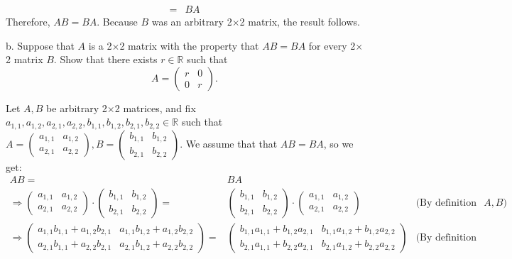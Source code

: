 \documentclass[12pt]{article}
\newenvironment{problem}[2][Problem]
{
	\begin{trivlist} 
		\item[\hskip \labelsep {\bfseries #1 #2:}]
	}
{
	\end{trivlist}
	}
\newenvironment{solution}[1][Solution]
{
	\begin{trivlist} 
		\item[\hskip \labelsep {\itshape #1:}]
	}
	{
	\end{trivlist}
}
\begin{document}
\begin{problem}{3}
\begin{solution}
\begin{align*}
=& BA
\end{align*}
Therefore, $AB=BA$. Because $B$ was an arbitrary 2$\times$2 matrix, the result follows.
\end{solution}
\noindent
\newline
\newline
b. Suppose that $A$ is a 2$\times$2 matrix with the property that $AB=BA$ for every 2$\times$2 matrix $B$. Show that there exists $r \in \mathbb{R}$ such that
\[
A=\begin{pmatrix}r&0\\0&r\end{pmatrix}\text{.}
\]
\begin{solution}
Let $A,B$ be arbitrary 2$\times$2 matrices, and fix $a_{1,1},a_{1,2},a_{2,1},a_{2,2},b_{1,1},b_{1,2},b_{2,1},b_{2,2} \in \mathbb{R}$ such that $A=\begin{pmatrix} a_{1,1} & a_{1,2} \\ a_{2,1} & a_{2,2} \end{pmatrix},B=\begin{pmatrix} b_{1,1} & b_{1,2} \\ b_{2,1} & b_{2,2} \end{pmatrix}$. We assume that that $AB=BA$, so we get:
\begin{align*}
AB=& BA &\\
\Rightarrow \begin{pmatrix} a_{1,1} & a_{1,2} \\ a_{2,1} & a_{2,2} \end{pmatrix} \cdot \begin{pmatrix} b_{1,1} & b_{1,2} \\ b_{2,1} & b_{2,2} \end{pmatrix} =&\begin{pmatrix} b_{1,1} & b_{1,2} \\ b_{2,1} & b_{2,2} \end{pmatrix} \cdot \begin{pmatrix} a_{1,1} & a_{1,2} \\ a_{2,1} & a_{2,2} \end{pmatrix}  & \text{(By definition of $A,B$)} \\
\Rightarrow \begin{pmatrix} a_{1,1}b_{1,1} + a_{1,2}b_{2,1} & a_{1,1}b_{1,2} + a_{1,2}b_{2,2} \\ a_{2,1}b_{1,1} + a_{2,2}b_{2,1} & a_{2,1}b_{1,2} + a_{2,2}b_{2,2} \end{pmatrix} =& \begin{pmatrix} b_{1,1}a_{1,1} + b_{1,2}a_{2,1} & b_{1,1}a_{1,2} + b_{1,2}a_{2,2} \\ b_{2,1}a_{1,1} + b_{2,2}a_{2,1} & b_{2,1}a_{1,2} + b_{2,2}a_{2,2} \end{pmatrix} &  \text{(By definition 3.2.1)}\\

\end{align*}
\end{solution}
\end{problem}
\end{document}
